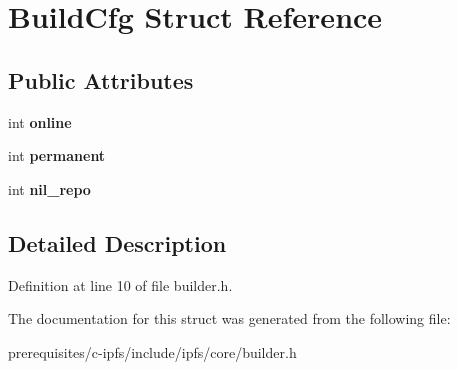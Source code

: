 \hypertarget{struct_build_cfg}{}\section{Build\+Cfg Struct Reference}
\label{struct_build_cfg}
\subsection*{Public Attributes}
\begin{DoxyCompactItemize}
\item 
\mbox{\label{struct_build_cfg_af6647bd444037751bed53d526f650eb3}} 
int {\bfseries online}
\item 
\mbox{\label{struct_build_cfg_ad78d5ad08be12e5491077016d3302f74}} 
int {\bfseries permanent}
\item 
\mbox{\label{struct_build_cfg_a71686ae4e7c32a26fc3b771e809a6282}} 
int {\bfseries nil\+\_\+repo}
\end{DoxyCompactItemize}


\subsection{Detailed Description}


Definition at line 10 of file builder.\+h.



The documentation for this struct was generated from the following file\+:\begin{DoxyCompactItemize}
\item 
prerequisites/c-\/ipfs/include/ipfs/core/builder.\+h\end{DoxyCompactItemize}
